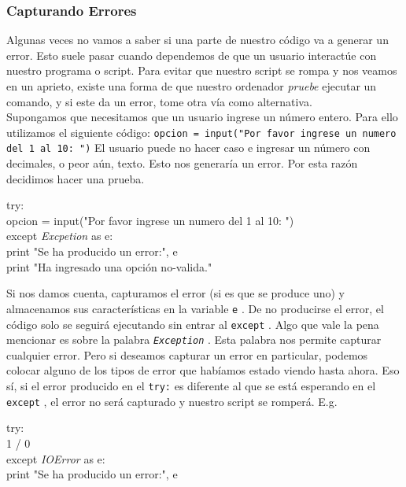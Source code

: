 \documentclass[10pt,letterpaper]{article}
\newcommand{\inlinecode}[1]{
\colorbox{light-gray}{\texttt{#1}}
}
\newenvironment{Code}
{
\begin{lrbox}{\selvestebox}%
\begin{minipage}{\dimexpr\columnwidth-2\fboxsep\relax}
\fontfamily{\ttdefault}\selectfont
}
{\end{minipage}\end{lrbox}%
\begin{center}
\colorbox{light-gray}{\usebox{\selvestebox}}
\end{center}
}
\begin{document}
\subsubsection{Capturando Errores}
Algunas veces no vamos a saber si una parte de nuestro c\'odigo va a generar un error. Esto suele pasar cuando dependemos de que un usuario interact\'ue con nuestro programa o script. Para evitar que nuestro script se rompa y nos veamos en un aprieto, existe una forma de que nuestro ordenador \emph{pruebe} ejecutar un comando, y si este da un error, tome otra v\'ia como alternativa.\\

Supongamos que necesitamos que un usuario ingrese un n\'umero entero. Para ello utilizamos el siguiente c\'odigo: \inlinecode{opcion = input("Por favor ingrese un numero del 1 al 10: ")} El usuario puede no hacer caso e ingresar un n\'umero con decimales, o peor a\'un, texto. Esto nos generar\'ia un error. Por esta raz\'on decidimos hacer una prueba.

\begin{Code}
try:\\
\hspace*{4mm} opcion = input("Por favor ingrese un numero del 1 al 10: ")\\
except \textit{Excpetion} as e:\\
\hspace*{4mm} print "Se ha producido un error:", e\\
\hspace*{4mm} print "Ha ingresado una opci\'on no-valida."
\end{Code}

Si nos damos cuenta, capturamos el error (si es que se produce uno) y almacenamos sus caracter\'isticas en la variable \inlinecode{e}. De no producirse el error, el c\'odigo solo se seguir\'a ejecutando sin entrar al \inlinecode{except}. Algo que vale la pena mencionar es sobre la palabra \inlinecode{\textit{Exception}}. Esta palabra nos permite capturar cualquier error. Pero si deseamos capturar un error en particular, podemos colocar alguno de los tipos de error que hab\'iamos estado viendo hasta ahora. Eso s\'i, si el error producido en el \inlinecode{try:} es diferente al que se est\'a esperando en el \inlinecode{except}, el error no ser\'a capturado y nuestro script se romper\'a. E.g.

\begin{Code}
try:\\
\hspace*{4mm} 1 / 0\\
except \textit{IOError} as e:\\
\hspace*{4mm} print "Se ha producido un error:", e
\end{Code}
\end{document}
